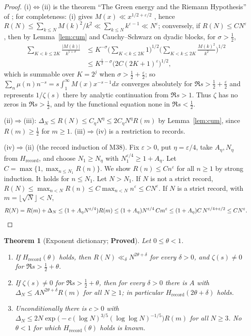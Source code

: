 \documentclass[11pt]{article}
\newtheorem{theorem}{Theorem}[section]
\theoremstyle{definition}
\theoremstyle{remark}
\newcommand{\Hrec}{H_{\mathrm{record}}}
\begin{document}
\begin{proof}
(i)$\Leftrightarrow$(ii) is the theorem ``The Green energy and the Riemann Hypothesis'' of \cite[\S12]{mm2}; for completeness: (i) gives $M(x)\ll x^{1/2+\varepsilon/2}$ \cite[\S14.25]{titchmarsh}, hence $R(N)\le\sum_{k\le N}M(k)^2/k^2\ll\sum_{k\le N}k^{\varepsilon-1}\ll N^\varepsilon$; conversely, if $R(N)\le CN^\varepsilon$, then by Lemma~\ref{lem:cum} and Cauchy--Schwarz on dyadic blocks, for $\sigma>\tfrac12$,
\begin{align*}
\sum_{K<k\le2K}\frac{|M(k)|}{k^{1+\sigma}}&\le K^{-\sigma}\Big(\sum_{K<k\le2K}1\Big)^{1/2}\Big(\sum_{K<k\le2K}\frac{M(k)^2}{k^2}\Big)^{1/2}\\
&\le K^{\frac12-\sigma}\big(2C(2K+1)^\varepsilon\big)^{1/2},
\end{align*}
which is summable over $K=2^j$ when $\sigma>\tfrac12+\tfrac\varepsilon2$; so $\sum_n\mu(n)n^{-s}=s\int_1^\infty M(x)x^{-s-1}dx$ converges absolutely for $\Re s>\tfrac12+\tfrac\varepsilon2$ and represents $1/\zeta(s)$ there by analytic continuation from $\Re s>1$. Thus $\zeta$ has no zeros in $\Re s>\tfrac12$, and by the functional equation none in $\Re s<\tfrac12$.

(ii)$\Rightarrow$(iii): $\Delta_N\le R(N)\le C_\eta N^\eta\le2C_\eta N^\eta R(m)$ by Lemma~\ref{lem:cum}, since $R(m)\ge\tfrac12$ for $m\ge1$. (iii)$\Rightarrow$(iv) is a restriction to records.

(iv)$\Rightarrow$(ii) (the record induction of M38). Fix $\varepsilon>0$, put $\eta=\varepsilon/4$, take $A_\eta,N_\eta$ from $\Hrec$, and choose $N_1\ge N_\eta$ with $N_1^{\varepsilon/4}\ge1+A_\eta$. Let $C=\max\{1,\max_{n\le N_1}R(n)\}$. We show $R(n)\le Cn^\varepsilon$ for all $n\ge1$ by strong induction. It holds for $n\le N_1$. Let $N>N_1$. If $N$ is not a strict record, $R(N)\le\max_{n<N}R(n)\le C\max_{n<N}n^\varepsilon\le CN^\varepsilon$. If $N$ is a strict record, with $m=\lfloor\sqrt N\rfloor<N$,
\[
R(N)=R(m)+\Delta_N\le(1+A_\eta N^{\varepsilon/4})R(m)\le(1+A_\eta)N^{\varepsilon/4}\,Cm^\varepsilon\le(1+A_\eta)C\,N^{\varepsilon/4+\varepsilon/2}\le CN^\varepsilon .\qedhere
\]
\end{proof}

\begin{theorem}[Exponent dictionary; \textbf{Proved}]\label{thm:exponent}
Let $0\le\theta<1$.
\begin{enumerate}
\item[(a)] If $\Hrec(\theta)$ holds, then $R(N)\ll_\delta N^{2\theta+\delta}$ for every $\delta>0$, and $\zeta(s)\ne0$ for $\Re s>\tfrac12+\theta$.
\item[(b)] If $\zeta(s)\ne0$ for $\Re s>\tfrac12+\theta$, then for every $\delta>0$ there is $A$ with $\Delta_N\le AN^{2\theta+\delta}R(m)$ for all $N\ge1$; in particular $\Hrec(2\theta+\delta)$ holds.
\item[(c)] Unconditionally there is $c>0$ with $\Delta_N\le2N\exp\!\big(-c(\log N)^{3/5}(\log\log N)^{-1/5}\big)R(m)$ for all $N\ge3$. No $\theta<1$ for which $\Hrec(\theta)$ holds is known.
\end{enumerate}
\end{theorem}
\end{document}
